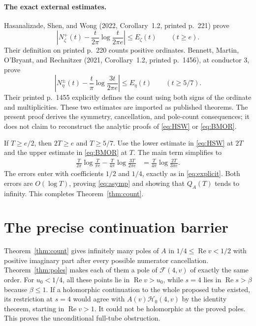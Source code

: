 \documentclass[11pt]{article}
\numberwithin{equation}{section}
\newcommand{\F}{\mathcal F}
\newcommand{\HH}{\mathcal H}
\newcommand{\Rea}{\operatorname{Re}}
\begin{document}
\paragraph{The exact external estimates.}
Hasanalizade, Shen, and Wong (2022, Corollary~1.2, printed p.~221)
prove
\begin{equation}\label{eq:HSW}
 \left|N_\zeta^+(t)-\frac{t}{2\pi}
             \log\frac{t}{2\pi e}\right|
 \le E_\zeta(t)\qquad(t\ge e).
\end{equation}
Their definition on printed p.~220 counts positive ordinates.
Bennett, Martin, O'Bryant, and Rechnitzer (2021, Corollary~1.2,
printed p.~1456), at conductor $3$, prove
\begin{equation}\label{eq:BMOR}
 \left|N_\eta^{\pm}(t)-\frac{t}{\pi}
                  \log\frac{3t}{2\pi e}\right|
 \le E_\eta(t)\qquad(t\ge5/7).
\end{equation}
Their printed p.~1455 explicitly defines the count using both
signs of the ordinate and multiplicities. These two estimates
are imported as published theorems. The present proof derives
the symmetry, cancellation, and pole-count consequences; it does
not claim to reconstruct the analytic proofs of
\eqref{eq:HSW} or \eqref{eq:BMOR}.

If $T\ge e/2$, then $2T\ge e$ and $T\ge5/7$.
Use the lower estimate in \eqref{eq:HSW} at $2T$ and the upper
estimate in \eqref{eq:BMOR} at $T$. The main term simplifies to
\begin{align}
 \frac{T}{2\pi}\log\frac{T}{\pi e}
 -\frac{T}{4\pi}\log\frac{3T}{2\pi e}
 &=\frac{T}{4\pi}\log\frac{2T}{3\pi e}.
\end{align}
The errors enter with coefficients $1/2$ and $1/4$, exactly as
in \eqref{eq:explicit}. Both errors are $O(\log T)$, proving
\eqref{eq:asymp} and showing that $Q_A(T)$ tends to infinity.
This completes Theorem~\ref{thm:count}.

\section{The precise continuation barrier}

Theorem~\ref{thm:count} gives infinitely many poles of $A$ in
$1/4\le\Rea v<1/2$ with positive imaginary part after every
possible numerator cancellation. Theorem~\ref{thm:poles} makes
each of them a pole of $\F(4,v)$ of exactly the same order.
For $u_0<1/4$, all these points lie in $\Rea v>u_0$, while
$s=4$ lies in $\Rea s>\beta$ because $\beta\le1$.
If a holomorphic continuation to the whole proposed tube existed,
its restriction at $s=4$ would agree with $A(v)\HH_0(4,v)$ by the
identity theorem, starting in $\Rea v>1$. It could not be
holomorphic at the proved poles. This proves the unconditional
full-tube obstruction.
\end{document}

